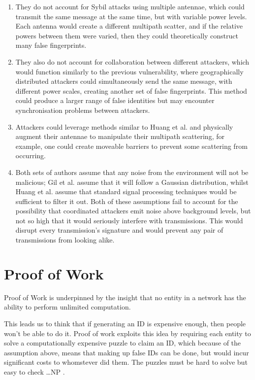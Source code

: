 \begin{enumerate}
    \item They do not account for Sybil attacks using multiple antennae, which could transmit the same message at the same time, but with variable power levels. Each antenna would create a different multipath scatter, and if the relative powers between them were varied, then they could theoretically construct many false fingerprints.
    \item They also do not account for collaboration between different attackers, which would function similarly to the previous vulnerability, where geographically distributed attackers could simultaneously send the same message, with different power scales, creating another set of false fingerprints. This method could produce a larger range of false identities but may encounter synchronisation problems between attackers.
    \item Attackers could leverage methods similar to Huang et al. and physically augment their antennae to manipulate their multipath scattering, for example, one could create moveable barriers to prevent some scattering from occurring.
    \item Both sets of authors assume that any noise from the environment will not be malicious; Gil et al. assume that it will follow a Gaussian distribution, whilst Huang et al. assume that standard signal processing techniques would be sufficient to filter it out. Both of these assumptions fail to account for the possibility that coordinated attackers emit noise above background levels, but not so high that it would seriously interfere with transmissions. This would disrupt every transmission's signature and would prevent any pair of transmissions from looking alike.
\end{enumerate}



\section{Proof of Work}
Proof of Work is underpinned by the insight that no entity in a network has the ability to perform unlimited computation.

This leads us to think that if generating an ID is expensive enough, then people won't be able to do it. Proof of work exploits this idea by requiring each entity to solve a computationally expensive puzzle to claim an ID, which because of the assumption above, means that making up false IDs can be done, but would incur significant costs to whomstever did them. The puzzles must be hard to solve but easy to check \dots NP \citationneeded. 

